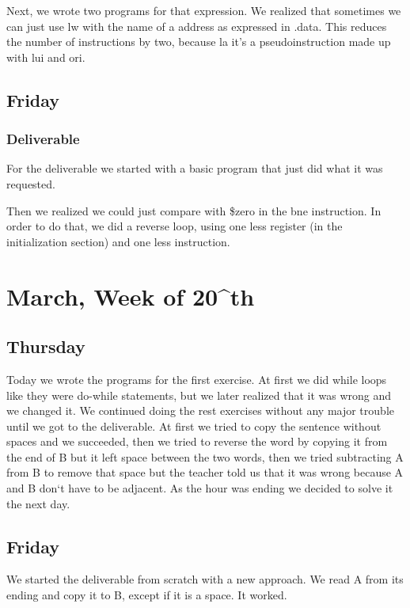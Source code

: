 \documentclass{report}
\begin{document}
Next, we wrote two programs for that expression. We realized that sometimes we can just use lw with the name of a address as expressed in .data. This reduces the number of instructions by two, because la it's a pseudoinstruction made up with lui and ori.

\section{Friday}

\subsection{Deliverable}

For the deliverable we started with a basic program that just did what it was requested.



Then we realized we could just compare with \$zero in the bne instruction. In order to do that, we did a reverse loop, using one less register (in the initialization section) and one less instruction.



\chapter{March, Week of 20^{th}}

\section{Thursday}
Today we wrote the programs for the first exercise. At first we did while loops like they were do-while statements, but we later realized that it was wrong and we changed it.
We continued doing the rest exercises without any major trouble until we got to the deliverable.
At first we tried to copy the sentence without spaces and we succeeded, then we tried to reverse the word by copying it from the end of B but it left space between the two words, then we tried subtracting A from B to remove that space but the teacher told us that it was wrong because A and B don`t have to be adjacent. As the hour was ending we decided to solve it the next day.
\section{Friday}
We started the deliverable from scratch with a new approach. We read A from its ending and copy it to B, except if it is a space. It worked.
\end{document}
